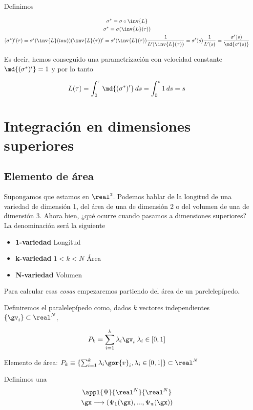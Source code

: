 Definimos

\begin{gather*}
\sigma^\ast = \sigma \circ \inv{L} \\
\sigma^\ast = \sigma(\inv{L}(\tau)) \\
(\sigma^\ast)'(\tau) = \sigma'(\inv{L}(tau)) (\inv{L}(\tau))' = \sigma'(\inv{L}(\tau)) \frac{1}{L'(\inv{L}(\tau))} = \sigma'(s) \frac{1}{L'(s)} = \frac{\sigma'(s)}{\md{\sigma'(s)}}
\end{gather*}

Es decir, hemos conseguido una parametrización con velocidad constante $\md{(\sigma^\ast)'} = 1$ y por lo tanto

\[ L(\tau) = \int_0^\tau \md{(\sigma^\ast)'}\,ds = \int_0^s 1\,ds = s \]

\section{Integración en dimensiones superiores}

\subsection{Elemento de área}

Supongamos que estamos en $\real^3$. Podemos hablar de la longitud de una variedad de dimensión 1, del área de una de dimensión 2 o del volumen de una de dimensión 3. Ahora bien, ¿qué ocurre cuando pasamos a dimensiones superiores? La denominación será la siguiente

\begin{itemize}
\item \textbf{1-variedad} Longitud
\item \textbf{k-variedad} $1<k<N$ Área
\item \textbf{N-variedad} Volumen
\end{itemize}

Para calcular esas \textit{cosas} empezaremos partiendo del área de un parelelepípedo.

Definiremos el paralelepípedo como, dados $k$ vectores independientes $\{\gv_i\} \subset \real^N$, 

\[ P_k = \sum_{i=1}^k \lambda_i\gv_i\;\lambda_i \in [0,1] \]


Elemento de área: $P_k \equiv \{ \sum_{i=1}^k \lambda_i\gor{v}_i, \lambda_i \in [0,1]\}\subset \real^N$

Definimos una \begin{gather*}
\appl{\Psi}{\real^N}{\real^N}\\
\gx \longrightarrow (\Psi_1(\gx),...,\Psi_n(\gx))
\end{gather*}

